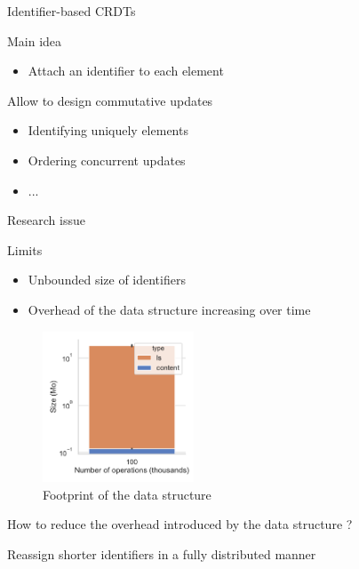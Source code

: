 \documentclass[10pt]{beamer}
\begin{document}
\begin{frame}{Identifier-based \acp{CRDT}}
  \begin{block}{Main idea}
    \begin{itemize}
      \item Attach an identifier to each element
    \end{itemize}
  \end{block}

  \bigskip

  \begin{block}{Allow to design commutative updates}
    \begin{itemize}
      \item Identifying uniquely elements
      \item Ordering concurrent updates
      \item ...
    \end{itemize}
  \end{block}
\end{frame}

\begin{frame}{Research issue}
  \begin{alertblock}{Limits}
    \begin{itemize}
      \item Unbounded size of identifiers
      \item Overhead of the data structure increasing over time
    \end{itemize}
  \end{alertblock}

  \pause

  \begin{figure}
    \centering
    \includegraphics[width=0.4\textwidth]{img/overhead-size.pdf}
    \caption{Footprint of the data structure}
  \end{figure}
\end{frame}

\begin{frame}[standout]
  \alert{How to reduce the overhead introduced by the data structure ?}

  \bigskip
  \pause

  Reassign shorter identifiers in a fully distributed manner
\end{frame}
\end{document}
